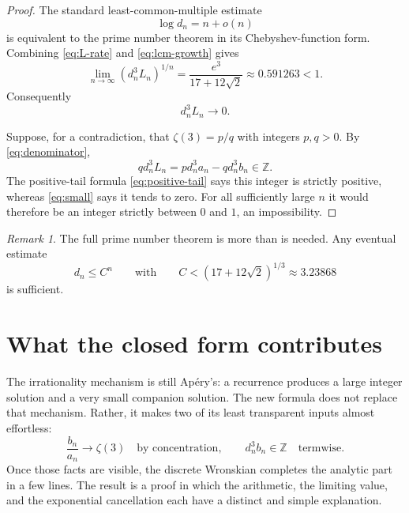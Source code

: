 \documentclass[11pt]{article}
\theoremstyle{remark}
\newtheorem*{remark}{Remark}
\newcommand{\zetaThree}{\zeta(3)}
\begin{document}
\begin{proof}
The standard least-common-multiple estimate
\begin{equation}\label{eq:lcm-growth}
 \log d_n=n+o(n)
\end{equation}
is equivalent to the prime number theorem in its Chebyshev-function form.
Combining \eqref{eq:L-rate} and \eqref{eq:lcm-growth} gives
\[
 \lim_{n\to\infty}(d_n^3L_n)^{1/n}
 =
 \frac{e^3}{17+12\sqrt2}
 \approx0.591263<1.
\]
Consequently
\begin{equation}\label{eq:small}
 d_n^3L_n\longrightarrow0.
\end{equation}

Suppose, for a contradiction, that \(\zetaThree=p/q\) with integers
\(p,q>0\).  By \eqref{eq:denominator},
\[
 qd_n^3L_n
 =
 pd_n^3a_n-qd_n^3b_n
 \in\mathbb Z.
\]
The positive-tail formula \eqref{eq:positive-tail} says this integer is
strictly positive, whereas \eqref{eq:small} says it tends to zero.  For all
sufficiently large \(n\) it would therefore be an integer strictly between
\(0\) and \(1\), an impossibility.
\end{proof}

\begin{remark}
The full prime number theorem is more than is needed.  Any eventual estimate
\[
 d_n\leq C^n
 \qquad\text{with}\qquad
 C<(17+12\sqrt2)^{1/3}\approx3.23868
\]
is sufficient.
\end{remark}

\section{What the closed form contributes}

The irrationality mechanism is still Apéry's: a recurrence produces a large
integer solution and a very small companion solution.  The new formula does
not replace that mechanism.  Rather, it makes two of its least transparent
inputs almost effortless:
\[
 \frac{b_n}{a_n}\longrightarrow\zetaThree
 \quad\text{by concentration},\qquad
 d_n^3b_n\in\mathbb Z
 \quad\text{termwise}.
\]
Once those facts are visible, the discrete Wronskian completes the analytic
part in a few lines.  The result is a proof in which the arithmetic, the
limiting value, and the exponential cancellation each have a distinct and
simple explanation.
\end{document}
